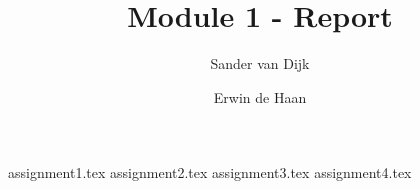 \documentclass[final]{scrreprt} %
\title{Module 1 - Report}
\author{Sander {van Dijk} \and Erwin {de Haan}}
\begin{document}
\maketitle
{assignment1.tex}
{assignment2.tex}
{assignment3.tex}
{assignment4.tex}
\end{document}
